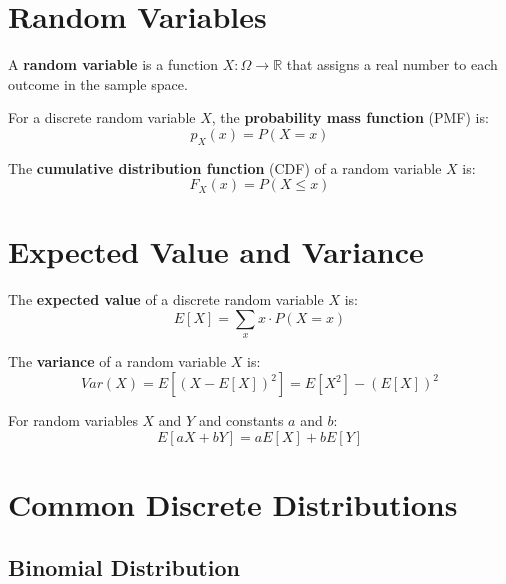 \section{Random Variables}

\begin{definition}
A \textbf{random variable} is a function $X: \Omega \to \mathbb{R}$ that assigns a real number to each outcome in the sample space.
\end{definition}

\begin{definition}
For a discrete random variable $X$, the \textbf{probability mass function} (PMF) is:
\[p_X(x) = P(X = x)\]
\end{definition}

\begin{definition}
The \textbf{cumulative distribution function} (CDF) of a random variable $X$ is:
\[F_X(x) = P(X \leq x)\]
\end{definition}

\section{Expected Value and Variance}

\begin{definition}
The \textbf{expected value} of a discrete random variable $X$ is:
\[E[X] = \sum_{x} x \cdot P(X = x)\]
\end{definition}

\begin{definition}[Variance]
The \textbf{variance} of a random variable $X$ is:
\[Var(X) = E[(X - E[X])^2] = E[X^2] - (E[X])^2\]
\end{definition}

\begin{theorem}
For random variables $X$ and $Y$ and constants $a$ and $b$:
\[E[aX + bY] = aE[X] + bE[Y]\]
\end{theorem}

\section{Common Discrete Distributions}

\subsection{Binomial Distribution}

